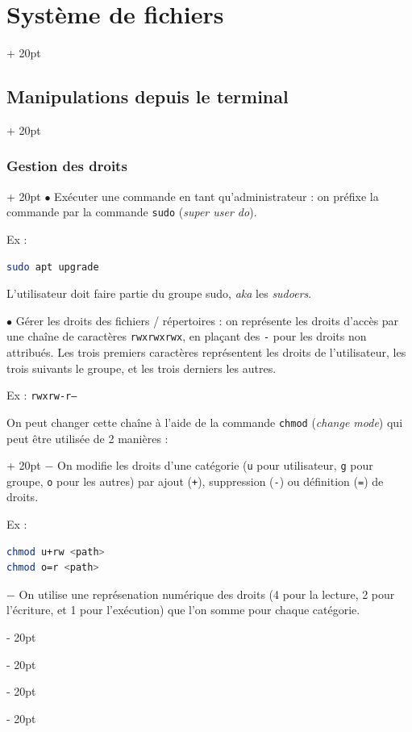 \documentclass[a4paper, 12pt, twoside]{article}
\renewcommand{\em}{\color{ff4500}}
\newcommand{\ind}[1][20pt]{\advance\leftskip + #1}
\newcommand{\deind}[1][20pt]{\advance\leftskip - #1}
\newenvironment{indentedenv}[1][20pt]{\par \ind[#1]}{\par \deind}
\newenvironment{indt}[2][20pt]{#2 \begin{indentedenv}[#1]}{\end{indentedenv}} %
\begin{document}
\begin{indt}{\section{Système de fichiers}}
\begin{indt}{\subsection{Manipulations depuis le terminal}}
            \vspace{12pt}
            
            \begin{indt}{\subsubsection{Gestion des droits}}
                $\bullet$ Exécuter une commande en tant qu'administrateur : on préfixe la commande par la commande \texttt{\em sudo} (\textit{super user do}).
                
                Ex :
                \begin{lstlisting}[language=Bash, xleftmargin=80pt]
sudo apt upgrade\end{lstlisting}
                
                L'utilisateur doit faire partie du groupe sudo, \textit{aka} les \textit{sudoers}.
                
                \vspace{12pt}
                
                $\bullet$ Gérer les droits des fichiers / répertoires : on représente les droits d'accès par une chaîne de caractères \texttt{rwxrwxrwx}, en plaçant des \texttt{-} pour les droits non attribués. Les trois premiers caractères représentent les droits de l'utilisateur, les trois suivants le groupe, et les trois derniers les autres.
                
                Ex : \texttt{rwxrw-r--}
                
                \begin{indt}{On peut changer cette chaîne à l'aide de la commande \texttt{\em chmod} (\textit{change mode}) qui peut être utilisée de 2 manières :}
                    $-$ On modifie les droits d'une catégorie (\texttt u pour utilisateur, \texttt g pour groupe, \texttt o pour les autres) par ajout (\texttt +), suppression (\texttt -) ou définition (\texttt =) de droits.
                    
                    Ex :
                    \begin{lstlisting}[language=Bash, xleftmargin=100pt]
chmod u+rw <path>
chmod o=r <path>\end{lstlisting}
                    
                    \vspace{12pt}
                    
                    $-$ On utilise une représenation numérique des droits (4 pour la lecture, 2 pour l'écriture, et 1 pour l'exécution) que l'on somme pour chaque catégorie.
                    

\end{indt}
\end{indt}
\end{indt}
\end{indt}
\end{document}
